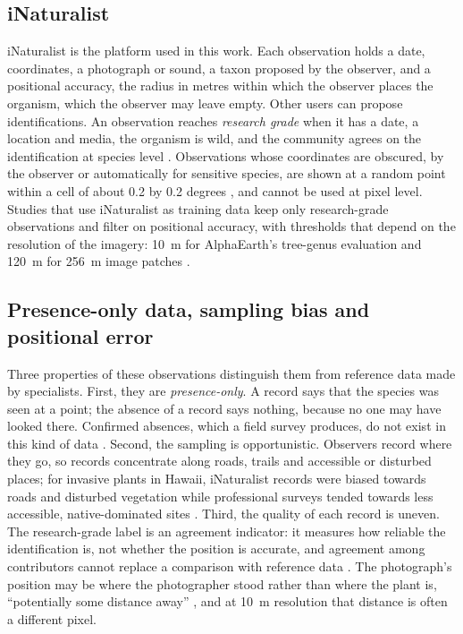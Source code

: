 \subsection{iNaturalist}
\label{sec:background-cs-inaturalist}

iNaturalist is the platform used in this work. Each observation holds
a date, coordinates, a photograph or sound, a taxon proposed by the
observer, and a positional accuracy, the radius in metres within which
the observer places the organism, which the observer may leave empty.
Other users can propose identifications. An observation reaches
\emph{research grade} when it has a date, a location and media, the
organism is wild, and the community agrees on the identification at
species level \cite{inat-researchgrade}. Observations whose
coordinates are obscured, by the observer or automatically for
sensitive species, are shown at a random point within a cell of about
0.2 by 0.2 degrees \cite{inat-geoprivacy}, and cannot be used at pixel
level. Studies that use iNaturalist as training data keep only
research-grade observations and filter on positional accuracy, with
thresholds that depend on the resolution of the imagery: 10~m for
AlphaEarth's tree-genus evaluation \cite{brown2025} and 120~m for
256~m image patches \cite{gillespie2024}.

\subsection{Presence-only data, sampling bias and positional error}
\label{sec:background-cs-presence-only}

Three properties of these observations distinguish them from
reference data made by specialists. First, they are
\emph{presence-only}. A record says that the species was seen at a
point; the absence of a record says nothing, because no one may have
looked there. Confirmed absences, which a field survey produces, do
not exist in this kind of data \cite{phillips2009}. Second, the
sampling is opportunistic. Observers record where they go, so records
concentrate along roads, trails and accessible or disturbed places;
for invasive plants in Hawaii, iNaturalist records were biased
towards roads and disturbed vegetation while professional surveys
tended towards less accessible, native-dominated sites
\cite{dimson2023}. Third, the quality of each record is uneven. The
research-grade label is an agreement indicator: it measures how
reliable the identification is, not whether the position is accurate,
and agreement among contributors cannot replace a comparison with
reference data \cite{fonte2017}. The photograph's position may be
where the photographer stood rather than where the plant is,
``potentially some distance away'' \cite{fonte2017}, and at 10~m
resolution that distance is often a different pixel.

